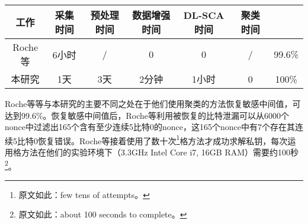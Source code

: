 {{{	\begin{table}[!h]
		\label{tab:improve}
		\centering
		\tiny%
		\begin{tabular}{c|cccccc}
			\hline
			工作&采集时间&预处理时间&数据增强时间&DL-SCA时间&聚类时间&\zyx\\
			\hline
			Roche等\citep{Roche21}&6小时&/&0&0&/&99.6\%\\
			本研究&1天&3天&2分钟&1小时&0&100\%\\
			\hline
		\end{tabular}
	\end{table}

	
	
	Roche等\citep{Roche21}等与本研究的主要不同之处在于他们使用聚类的方法恢复敏感中间值，\zyx 可达到99.6\%。恢复敏感中间值后，Roche等\citep{Roche21}利用被恢复的比特泄漏可以从6000个nonce中过滤出165个含有至少连续5比特0的nonce，这165个nonce中有7个存在其连续5比特0恢复错误。Roche等\citep{Roche21}接着使用了数十次\footnote{原文如此：few tens of attempts。}格方法才成功求解私钥，每次运用格方法在他们的实验环境下（3.3GHz Intel Core i7, 16GB RAM）需要约100秒\footnote{原文如此：about 100 seconds to complete。}。
	
	
}}}

